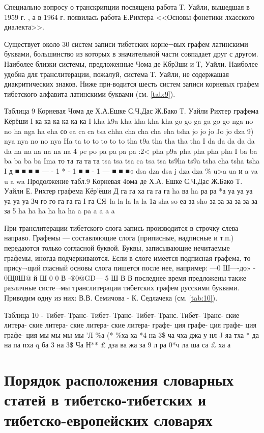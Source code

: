 {Специально вопросу о транскрипции посвящена работа Т. Уайли, вышедшая в 1959 г. , а в 1964 г. появилась работа Е.Рихтера <<Основы фонетики лхасского диалекта>>.

Существует около 30 систем записи тибетских корне¬вых графем латинскими буквами, большинство из которых в значительной части совпадает друг с другом. Наиболее близки системы, предложенные Чома де КбрЗши и Т, Уайли. Наиболее удобна для транслитерации, пожалуй, система Т. Уайли, не содержащая диакритических знаков. Ниже при-водится шесть систем записи корневых графем тибетского алфавита латинскими буквами (см. \ref{tab:9}).

Таблица 9
Корневая Чома де Х.А.Ешке С.Ч.Дас Ж.Бако Т. Уайли Рихтер графема Кёрёши
I	ка	 ка	ка	ка	ка	ка
 	I	kha	k9a	kha	kha	kha	kha
	go	go	ga	ga	go	go
nga	no	no	ha	nga	ha
 	eha	со	ea	ca	ca	tsa
chha cha	cha cha	eha tsha
jo	jo	jo	Jo	jo	dza
9)	nya	nya	no	no	nya	Ha
 	ta	to	to	to	to	to
 	tha	t9a	tha	tha	tha	tha
I da	da	da	da	da	da
 	na	na	na	na	na	na
 4	pe	po	pa	pa	pa	pa
:2<	pha	p9a	pha	pha	pha	pha
 	I ba	ba	ba	ba	ba	ba
Ima	то	та	та	та	та
tsa	tsa	tsa	ca	tsa	tsa
 	ts9ha	ts9a	tsha	cha	tsha	tsha
		I		  д	■ ■ ■	■ —	- 1	*	-	1	■ ■	- 1	— ■	■ ■«
 	dsa	dza	dsa	j	dza	dza
\%	u>a	ua	и a	va	u a	wa
Продолжение табл.9
Корневая 4ома де Х.А. Ешке С.Ч.Дас Ж.Бако Т. Уайли Е. Рихтер графема	Кёр'ёши
Д	га	га	ха	га	га	га
ha	ва	ha	ра	ра	*а
уа	уа	уа	уа	уа	уа
Зч го	го	 га  га  га I га	
СЯ\	la	la	la	la	la	1а
 	sha	so	еа	за	sho	за
за	за	за	за	за	за
5	ha	ha	ha	ha	ha	ha
a	pa	a	a	a	a

При транслитерации тибетского слога запись производится в строчку слева направо.
Графемы --- составляющие слога (приписные, надписные и т.п.) передаются только согласной буквой.
Буквы, записывающие нечитаемые графемы, иногда подчеркиваются.
Если в слоге имеется подписная графема, то прису¬щий гласный основы слога пишется после нее, например:
—0 Ш—-до» - 0Щ0Ш@
й Ш 0 0
В
-®0@GD—
5 Ш
В
В последнее время предложены также различные систе¬мы транслитерации тибетских графем русскими буквами. Приводим одну из них: В.В. Семичова - К. Седлачека (см. \ref{tab:10}).

Таблица 10
		 		 	 	-
Тибет- Транс- Тибет- Транс- Тибет- Транс. Тибет- Транс- ские литера-	ские	литера-	ские	литера-	ские	литера-
графе- ция	графе-	ция	графе-	ция	графе-	ция
мы	мы	мы	мы
’Л \%а	(* \%ха	ха	*4 на
3\$ ча	чха   джа	у	нл
J	яа	тха	* да	 на
 	па	 	пха	q	ба	3	на
3\$ Ча	Н**	£ дза	ва
жа	  за	9	л
 	ра	0*ч	ла	 	ша	 	са
£	ха	а

\section{Порядок расположения словарных статей в тибетско-тибетских и тибетско-европейских словарях}

}
